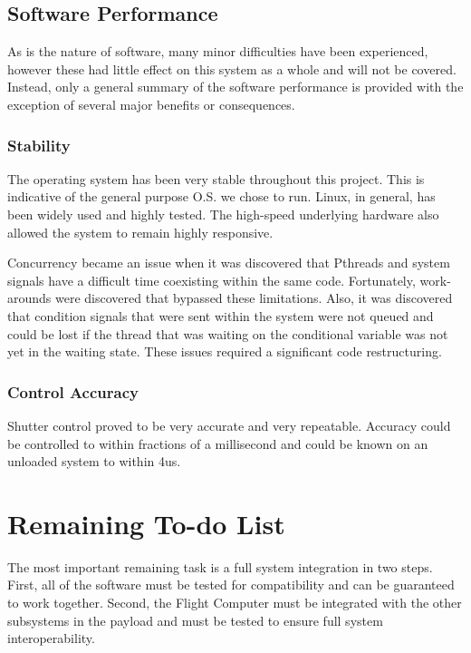 \documentclass[11pt,titlepage]{article}
\begin{document}
\subsection{Software Performance}

As is the nature of software, many minor difficulties have been experienced, however these had little effect on this system as a whole and will
not be covered. Instead, only a general summary of the software performance is provided with the exception of several major benefits or consequences.

\subsubsection{Stability}

The operating system has been very stable throughout this project. This is indicative of the general purpose O.S. we chose to run. Linux, in general, 
has been widely used and highly tested. The high-speed underlying hardware also allowed the system to remain highly responsive.	


Concurrency became an issue when it was discovered that Pthreads and system signals have a difficult time 
coexisting within the same code. Fortunately, work-arounds were discovered that bypassed these limitations. Also, it
  was discovered that condition signals that were sent within the system were not queued and could be lost if
  the thread that was waiting on the conditional variable was not yet in the waiting state. These issues required a significant code restructuring.

\subsubsection{Control Accuracy}
Shutter control proved to be very accurate and very repeatable. Accuracy could be controlled to within fractions 
of a millisecond and could be known on an unloaded system to within 4us.

\section{Remaining To-do List}

The most important remaining task is a full system integration in two steps. First, all of the software must be tested for compatibility and can be
guaranteed to work together. Second, the Flight Computer must be integrated with the other subsystems in the payload and must be tested to ensure full
system interoperability.
\end{document}
